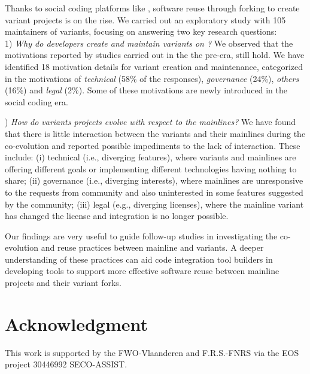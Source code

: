 Thanks to social coding platforms like \gh, software reuse through forking to create variant projects is on the rise.
We carried out an exploratory study with 105 maintainers of variants, focusing on answering two key research questions:\\
1) \textit{Why do developers create and maintain variants on \gh?}
We observed that the motivations reported by studies carried out in the the pre-\gh era, still hold. We have identified 18 motivation details  for variant creation and maintenance, categorized in the motivations of \emph{technical} (58\% of the responses), \emph{governance} (24\%), \emph{others} (16\%) and \emph{legal} (2\%). Some of these motivations are newly introduced in the social coding era.

) \textit{How do variants projects evolve with respect to the mainlines?}
We have found that there is little interaction between the variants and their mainlines during the co-evolution and reported possible impediments to the lack of interaction. These include: (i) technical (i.e., diverging features), where variants and mainlines are offering different goals or implementing different technologies having nothing to share; (ii) governance (i.e., diverging interests), where mainlines are unresponsive to the requests from community and also uninterested in some features suggested by the community; (iii) legal (e.g., diverging licenses), where the mainline variant has changed the license and integration is no longer possible.

Our findings are very useful to guide follow-up studies in investigating the co-evolution and reuse practices between mainline and variants. A deeper understanding of these practices can aid code integration tool builders in developing tools to support more effective software reuse between mainline projects and their variant forks.

\section*{Acknowledgment}
This work is supported by the FWO-Vlaanderen and F.R.S.-FNRS via the EOS project 30446992 SECO-ASSIST.


